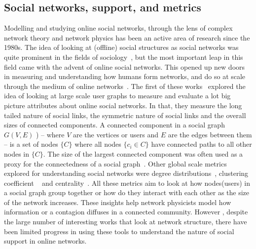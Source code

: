 \subsection{Social networks, support, and metrics}
Modelling and studying online social networks, through the lens of complex network theory and network physics has been an active area of research since the 1980s. The idea of looking at (offline) social structures as social networks was quite prominent in the fields of sociology~\cite{scott1988social}, but the most important leap in this field came with the advent of online social networks. This opened up new doors in measuring and understanding how humans form networks, and do so at scale through the medium of online networks~\cite{mislove2007measurement}. The first of these works~\cite{mislove2007measurement} explored the idea of looking at large scale user graphs to measure and evaluate a lot big picture attributes about online social networks. In that, they measure the long tailed nature of social links, the symmetric nature of social links and the overall sizes of connected components.
A connected component in a social graph $G(V,E)$ ) -- where $V$ are the vertices or users and $E$ are the edges between them -- is a set of nodes $\{C\}$ where all nodes $\{c_i \in C\}$ have connected paths to all other nodes in $\{C\}$. The size of the largest connected component was often used as a proxy for the connectedness of a social graph~\cite{myers2014information,traud2012social,woodhouse1994mapping}.
Other global scale metrics explored for understanding social networks were degree distributions~\cite{muchnik2013origins,newman2002random, kossinets2006empirical}, clustering coefficient ~\cite{opsahl2013triadic, toivonen2006model} and centrality~\cite{opsahl2010node, borgatti2009network}. All these metrics aim to look at how nodes(users) in a social graph group together or how do they interact with each other as the size of the network increases. 
These insights help network physicists model how information or a contagion diffuses in a connected community. However , despite the large number of interesting works that look at network structure, there have been limited progress in using these tools to understand the nature of social support in online networks.

